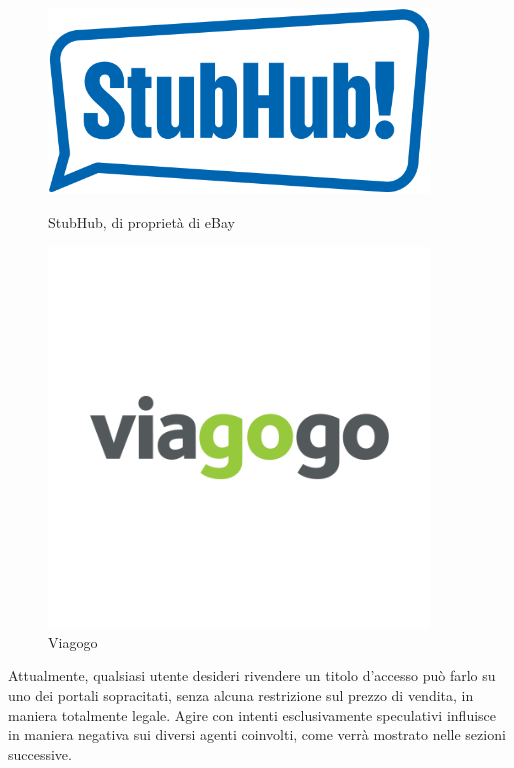 \begin{figure}[H]
    \centering
    \begin{minipage}{0.45\textwidth}
        \centering
        \includegraphics[width=0.9\textwidth]{chapter2/immagini/StubHub} %
        \caption{StubHub, di proprietà di eBay}
    \end{minipage}\hfill
    \begin{minipage}{0.45\textwidth}
        \centering
        \includegraphics[width=0.9\textwidth]{chapter2/immagini/viagogo_logo_fb} %
        \caption{Viagogo}
    \end{minipage}
\end{figure}
Attualmente, qualsiasi utente desideri rivendere un titolo d'accesso può farlo su uno dei portali sopracitati, senza alcuna restrizione sul prezzo di vendita, in maniera totalmente legale. Agire con intenti esclusivamente speculativi influisce in maniera negativa sui diversi agenti coinvolti, come verrà mostrato nelle sezioni successive. 
